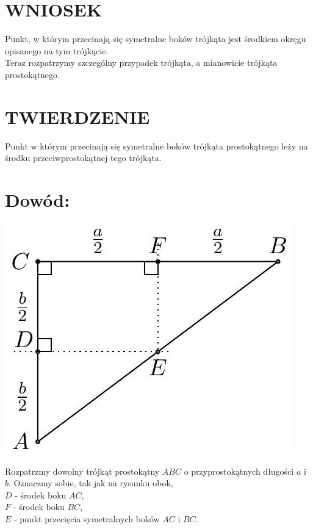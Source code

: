 \documentclass[10pt]{article}
\begin{document}
\section*{WNIOSEK}
Punkt, w którym przecinają się symetralne boków trójkąta jest środkiem okręgu opisanego na tym trójkącie.\\
Teraz rozpatrzymy szczególny przypadek trójkąta, a mianowicie trójkąta prostokątnego.

\section*{TWIERDZENIE}
Punkt w którym przecinają się symetralne boków trójkąta prostokątnego leży na środku przeciwprostokątnej tego trójkąta.

\section*{Dowód:}
\begin{center}
\includegraphics[max width=\textwidth]{2024_11_21_71f62bd117d375398909g-155}
\end{center}

Rozpatrzmy dowolny trójkąt prostokątny \(A B C\) o przyprostokątnych długości \(a\) i \(b\). Oznaczmy sobie, tak jak na rysunku obok,\\
\(D\) - środek boku \(A C\),\\
\(F\) - środek boku \(B C\),\\
\(E\) - punkt przecięcia symetralnych boków \(A C\) i \(B C\).
\end{document}
